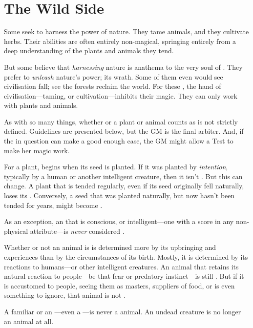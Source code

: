 
\section{The Wild Side}

Some  seek to harness the power of nature.
They tame animals, and they cultivate herbs.
Their abilities are often entirely non-magical, springing entirely from a deep understanding of the plants and animals they tend.

But some believe that \emph{harnessing} nature is anathema to the very soul of .
They prefer to \emph{unleash} nature's power; its wrath.
Some of them even would see civilisation fall; see the forests reclaim the world.
For these , the hand of civilisation---taming, or cultivation---inhibits their magic.
They can only work with {\wild} plants and animals.

As with so many things, whether or a plant or animal counts as {\wild} is not strictly defined.
Guidelines are presented below, but the GM is the final arbiter.
And, if the  in question can make a good enough case, the GM might allow a Test to make her magic work.

For a plant, {\wildness} begins when its seed is planted.
If it was planted by \emph{intention}, typically by a human or another intelligent creature, then it isn't {\wild}.
But this can change.
A plant that is tended regularly, even if its seed originally fell naturally, loses its {\wildness}.
Conversely, a seed that was planted naturally, but now hasn't been tended for years, might become {\wild}.

As an exception, an  that is conscious, or intelligent---one with a score in any non-physical attribute---is \emph{never} considered {\wild}.

Whether or not an animal is {\wild} is determined more by its upbringing and experiences than by the circumstances of its birth.
Mostly, it is determined by its reactions to humans---or other intelligent creatures.
An animal that retains its natural reaction to people---be that fear or predatory instinct---is still {\wild}.
But if it is accustomed to people, seeing them as masters, suppliers of food, or is even something to ignore, that animal is not {\wild}.

A familiar or an ---even a ---is never a {\wild} animal.
An undead creature is no longer an animal at all.

